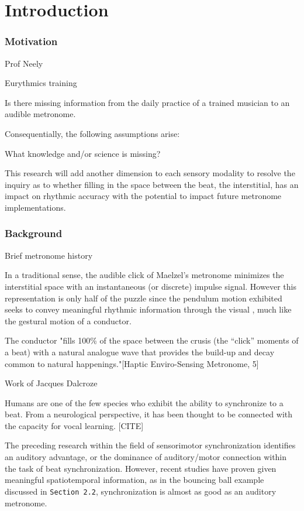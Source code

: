 
\chapter{Introduction} \label{secIntro}
\subsection{Motivation}
Prof Neely

Eurythmics training

Is there missing information from the daily practice of a trained musician to an audible metronome. 

Consequentially, the following assumptions arise:

What knowledge and/or science is missing?

This research will add another dimension to each sensory modality to resolve the inquiry as to whether filling in the space between the beat, the interstitial, has an impact on rhythmic accuracy with the potential to impact future metronome implementations. 


\subsection{Background}
Brief metronome history

In a traditional sense, the audible click of Maelzel's metronome minimizes the interstitial space with an instantaneous (or discrete) impulse signal. However this representation is only half of the puzzle since the pendulum motion exhibited seeks to convey meaningful rhythmic information through the visual , much like the gestural motion of a conductor.

The conductor "fills 100\% of the space between the crusis (the “click” moments of a beat) with a natural analogue wave that provides the build-up and decay common to natural happenings."[Haptic Enviro-Sensing Metronome, 5]

Work of Jacques Dalcroze

Humans are one of the few species who exhibit the ability to synchronize to a beat. From a neurological perspective, it has been thought to be connected with the capacity for vocal learning. [CITE]

The preceding research within the field of sensorimotor synchronization identifies an auditory advantage, or the dominance of auditory/motor connection within the task of beat synchronization. However, recent studies have proven given meaningful spatiotemporal information, as in the bouncing ball example discussed in \verb!Section 2.2!, synchronization is almost as good as an auditory metronome.

